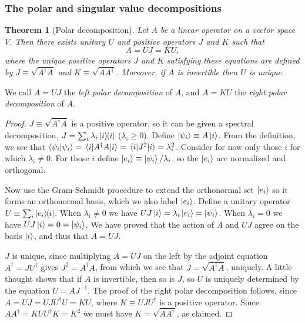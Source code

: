 \documentclass{article}
\newtheorem{theorem}{Theorem}
\numberwithin{theorem}{section}
\numberwithin{corollary}{section}
\numberwithin{postulate}{section}
\begin{document}
\subsubsection{The polar and singular value decompositions}

\begin{theorem}[Polar decomposition]
  Let $A$ be a linear operator on a vector space $V$. Then there exists unitary
  $U$ and positive operators $J$ and $K$ such that \[
    A = UJ = KU,
  \] where the unique positive operators $J$ and $K$ satisfying these equations
  are defined by $J \equiv \sqrt{A^{\dagger}A}$ and $K \equiv
  \sqrt{AA^{\dagger}}$. Moreover, if $A$ is invertible then $U$ is unique.
\end{theorem}

We call $A = UJ$ the \emph{left polar decomposition} of $A$, and $A = KU$ the
\emph{right polar decomposition} of $A$.

\begin{proof}
  $J \equiv \sqrt{A^{\dagger}A}$ is a positive operator, so it can be given a
  spectral decomposition, $J = \sum_i \lambda_i\op{i}{i}$ ($\lambda_i \geq 0$).
  Define $\ket{\psi_i} \equiv A\ket{i}$. From the definition, we see that
  $\ip{\psi_i} = \mel{i}{A^{\dagger}A}{i} = \mel{i}{J^2}{i} =
  \lambda_i^2$. Consider for now only those $i$ for which $\lambda_i \neq 0$.
  For those $i$ define $\ket{e_i} \equiv \ket{\psi_i}/\lambda_i$, so the
  $\ket{e_i}$ are normalized and orthogonal.

  Now use the Gram-Schmidt procedure to extend the orthonormal set $\ket{e_i}$
  so it forms an orthonormal basis, which we also label $\ket{e_i}$. Define a
  unitary operator $U \equiv \sum_i \op{e_i}{i}$. When $\lambda_i \neq 0$ we
  have $UJ\ket{i} = \lambda_i\ket{e_i} = \ket{\psi_i}$. When $\lambda_i = 0$ we
  have $UJ\ket{i} = 0 = \ket{\psi_i}$. We have proved that the action of $A$
  and $UJ$ agree on the basis $\ket{i}$, and thus that $A = UJ$.

  $J$ is unique, since multiplying $A = UJ$ on the left by the adjoint equation
  $A^{\dagger} = JU^{\dagger}$ gives $J^2 = A^{\dagger}A$, from which we see
  that $J = \sqrt{A^{\dagger}A}$, uniquely. A little thought shows that if $A$
  is invertible, then so is $J$, so $U$ is uniquely determined by the equation
  $U = AJ^{-1}$. The proof of the right polar decomposition follows, since $A =
  UJ = UJU^{\dagger}U = KU$, where $K \equiv UJU^{\dagger}$ is a positive
  operator. Since $AA^{\dagger} = KUU^{\dagger}K = K^2$ we must have $K =
  \sqrt{AA^{\dagger}}$, as claimed.
\end{proof}
\end{document}
